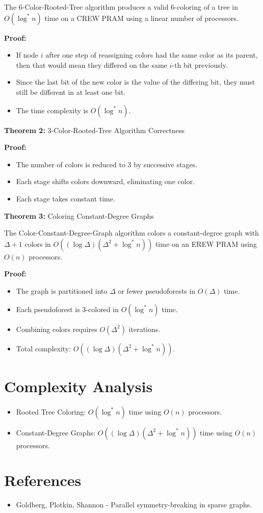 \documentclass{article}
\begin{document}
The 6-Color-Rooted-Tree algorithm produces a valid 6-coloring of a tree in $O(\log^* n)$ time on a CREW PRAM using a linear number of processors.

\textbf{Proof:}
\begin{itemize}
    \item If node $i$ after one step of reassigning colors had the same color as its parent, then that would mean they differed on the same $i$-th bit previously.
    \item Since the last bit of the new color is the value of the differing bit, they must still be different in at least one bit.
    \item The time complexity is $O(\log^* n)$.
\end{itemize}

\textbf{Theorem 2:} 3-Color-Rooted-Tree Algorithm Correctness

\textbf{Proof:}
\begin{itemize}
    \item The number of colors is reduced to 3 by successive stages.
    \item Each stage shifts colors downward, eliminating one color.
    \item Each stage takes constant time.
\end{itemize}

\textbf{Theorem 3:} Coloring Constant-Degree Graphs

The Color-Constant-Degree-Graph algorithm colors a constant-degree graph with $\Delta + 1$ colors in $O((\log \Delta)(\Delta^2 + \log^* n))$ time on an EREW PRAM using $O(n)$ processors.

\textbf{Proof:}
\begin{itemize}
    \item The graph is partitioned into $\Delta$ or fewer pseudoforests in $O(\Delta)$ time.
    \item Each pseudoforest is 3-colored in $O(\log^* n)$ time.
    \item Combining colors requires $O(\Delta^2)$ iterations.
    \item Total complexity: $O((\log \Delta)(\Delta^2 + \log^* n))$.
\end{itemize}

\section{Complexity Analysis}
\begin{itemize}
    \item Rooted Tree Coloring: $O(\log^* n)$ time using $O(n)$ processors.
    \item Constant-Degree Graphs: $O((\log \Delta)(\Delta^2 + \log^* n))$ time using $O(n)$ processors.
\end{itemize}

\section{References}
\begin{itemize}
    \item Goldberg, Plotkin, Shannon - Parallel symmetry-breaking in sparse graphs.
\end{itemize}
\end{document}
